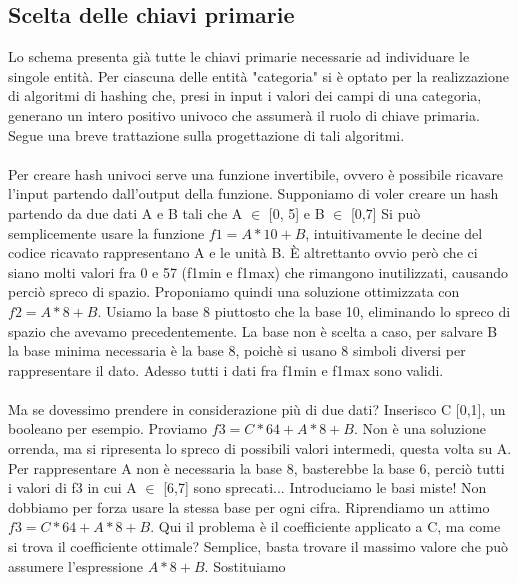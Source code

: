 \documentclass[a4paper,12pt]{report}
\begin{document}
            \subsection*{Scelta delle chiavi primarie}
            Lo schema presenta già tutte le chiavi primarie necessarie ad individuare le singole entità.
            Per ciascuna delle entità "categoria" si è optato per la realizzazione di algoritmi di hashing che, 
            presi in input i valori dei campi di una categoria, generano un intero positivo univoco che assumerà
            il ruolo di chiave primaria. Segue una breve trattazione sulla progettazione di tali algoritmi.\\
            \\
            Per creare hash univoci serve una funzione invertibile, ovvero è possibile ricavare l'input partendo 
            dall'output della funzione.
            Supponiamo di voler creare un hash partendo da due dati A e B tali che A $\in$ [0, 5] e B $\in$ [0,7]
            Si può semplicemente usare la funzione $f1 = A * 10 + B$, intuitivamente le decine del codice ricavato 
            rappresentano A e le unità B. È altrettanto ovvio però che ci siano molti valori fra 0 e 57 
            (f1min e f1max) che rimangono inutilizzati, causando perciò spreco di spazio. Proponiamo quindi una 
            soluzione ottimizzata con $f2 = A * 8 + B$. Usiamo la base 8 piuttosto che la base 10, eliminando lo 
            spreco di spazio che avevamo precedentemente. La base non è scelta a caso, per salvare B la base minima 
            necessaria è la base 8, poichè si usano 8 simboli diversi per rappresentare il dato. Adesso tutti i dati 
            fra f1min e f1max sono validi. \\
            \\
            Ma se dovessimo prendere in considerazione più di due dati?
            Inserisco C [0,1], un booleano per esempio. Proviamo $f3 = C * 64 + A * 8 + B$. Non è una soluzione orrenda, 
            ma si ripresenta lo spreco di possibili valori intermedi, questa volta su A. Per rappresentare A non è 
            necessaria la base 8, basterebbe la base 6, perciò tutti i valori di f3 in cui A $\in$ [6,7] sono sprecati...
            Introduciamo le basi miste! Non dobbiamo per forza usare la stessa base per ogni cifra. Riprendiamo un attimo 
            $f3 = C * 64 + A * 8 + B$. Qui il problema è il coefficiente applicato a C, ma come si trova il coefficiente 
            ottimale? Semplice, basta trovare il massimo valore che può assumere l'espressione $A * 8 + B$. Sostituiamo 
\end{document}
